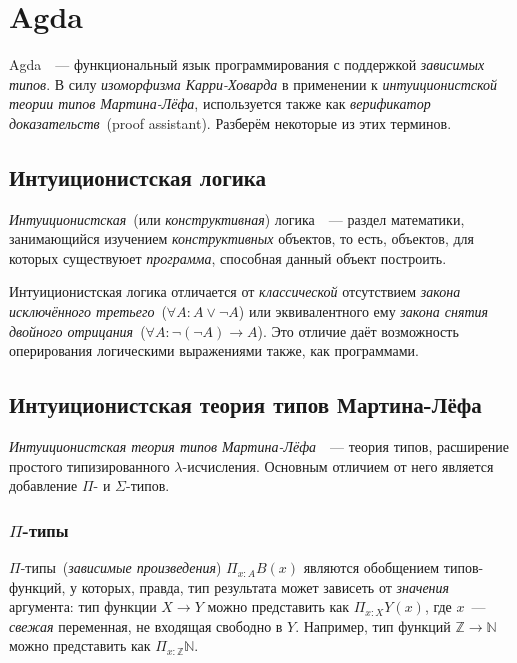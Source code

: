\section{Agda}

Agda~\cite{agda}~--- функциональный язык программирования с поддержкой
\emph{зависимых типов}. В силу \emph{изоморфизма Карри-Ховарда} в
применении к \emph{интуиционистской теории типов Мартина-Лёфа},
используется также как \emph{верификатор доказательств}~(proof
assistant). Разберём некоторые из этих терминов.

\subsection{Интуиционистская логика}

\emph{Интуиционистская}~(или \emph{конструктивная})
логика~\cite{шень2,curryhoward}~--- раздел математики, занимающийся
изучением \emph{конструктивных} объектов, то есть, объектов, для
которых существуюет \emph{программа}, способная данный объект
построить.

Интуиционистская логика отличается от \emph{классической} отсутствием
\emph{закона исключённого третьего}~($\forall A : A \vee \neg A$) или
эквивалентного ему \emph{закона снятия двойного отрицания}~($\forall A
: \neg (\neg A) \to A$). Это отличие даёт возможность оперирования
логическими выражениями также, как программами.

\subsection{Интуиционистская теория типов Мартина-Лёфа}

\emph{Интуиционистская теория типов Мартина-Лёфа}~\cite{mltt}~---
теория типов, расширение простого типизированного
$\lambda$-исчисления. Основным отличием от него является добавление
$\Pi$- и $\Sigma$-типов.

\subsubsection{$\Pi$-типы}

$\Pi$-типы~(\emph{зависимые произведения}) $\Pi_{x:A} B(x)$ являются
обобщением типов-функций, у которых, правда, тип результата может
зависеть от \emph{значения} аргумента: тип функции $X \to Y$ можно
представить как $\Pi_{x:X} Y(x)$, где $x$~--- \emph{свежая}
переменная, не входящая свободно в $Y$. Например, тип функций
$\mathbb{Z} \to \mathbb{N}$ можно представить как $\Pi_{x:\mathbb{Z}}
\mathbb{N}$.

